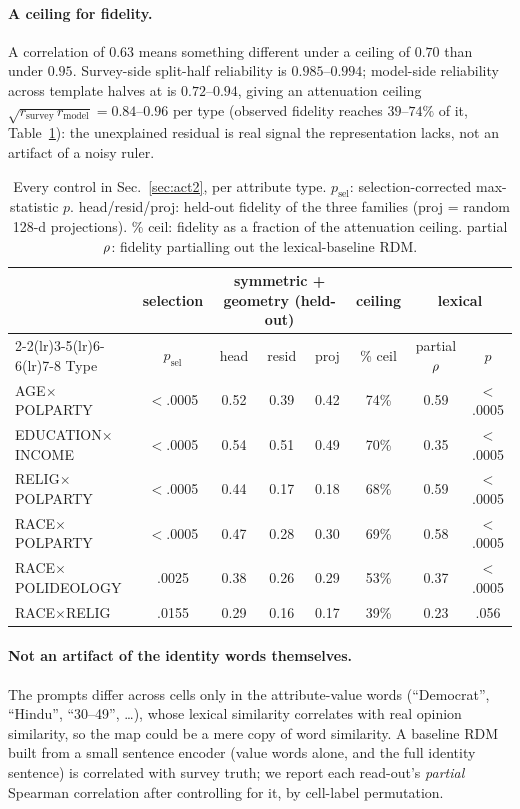 \paragraph{A ceiling for fidelity.} A correlation of $0.63$ means
something different under a ceiling of $0.70$ than under $0.95$.
Survey-side split-half reliability is $0.985$--$0.994$; model-side
reliability across template halves at \starhead{} is $0.72$--$0.94$,
giving an attenuation ceiling $\sqrt{r_{\text{survey}}\,r_{\text{model}}}
= 0.84$--$0.96$ per type (observed fidelity reaches $39$--$74\%$ of it,
Table~\ref{tab:controls}): the unexplained residual is real signal the
representation lacks, not an artifact of a noisy ruler.

\begin{table}[t]
\centering\footnotesize
\setlength{\tabcolsep}{4pt}
\caption{Every control in Sec.~\ref{sec:act2}, per attribute type.
$p_{\text{sel}}$: selection-corrected max-statistic $p$. head/resid/proj:
held-out fidelity of the three families (proj = random 128-d
projections). \% ceil: \starhead{} fidelity as a fraction of the
attenuation ceiling. partial $\rho$: \starhead{} fidelity partialling
out the lexical-baseline RDM.}
\label{tab:controls}
\begin{tabular}{lccccccc}
\toprule
& \multicolumn{1}{c}{selection} & \multicolumn{3}{c}{symmetric + geometry (held-out)}
& \multicolumn{1}{c}{ceiling} & \multicolumn{2}{c}{lexical}\\
\cmidrule(lr){2-2}\cmidrule(lr){3-5}\cmidrule(lr){6-6}\cmidrule(lr){7-8}
Type & $p_{\text{sel}}$ & head & resid & proj & \% ceil & partial $\rho$ & $p$\\
\midrule
AGE$\times$POLPARTY & $<$.0005 & 0.52 & 0.39 & 0.42 & 74\% & 0.59 & $<$.0005 \\
EDUCATION$\times$INCOME & $<$.0005 & 0.54 & 0.51 & 0.49 & 70\% & 0.35 & $<$.0005 \\
RELIG$\times$POLPARTY & $<$.0005 & 0.44 & 0.17 & 0.18 & 68\% & 0.59 & $<$.0005 \\
RACE$\times$POLPARTY & $<$.0005 & 0.47 & 0.28 & 0.30 & 69\% & 0.58 & $<$.0005 \\
RACE$\times$POLIDEOLOGY & .0025 & 0.38 & 0.26 & 0.29 & 53\% & 0.37 & $<$.0005 \\
RACE$\times$RELIG & .0155 & 0.29 & 0.16 & 0.17 & 39\% & 0.23 & .056 \\
\bottomrule
\end{tabular}
\end{table}

\paragraph{Not an artifact of the identity words themselves.}
\label{sec:lexical}
The prompts differ across cells only in the attribute-value words
(``Democrat'', ``Hindu'', ``30--49'', \dots), whose lexical similarity
correlates with real opinion similarity, so the map could be a mere copy
of word similarity. A baseline RDM built from a small sentence encoder
\citep{minilm2020} (value words alone, and the full identity sentence)
is correlated with survey truth; we report each read-out's
\emph{partial} Spearman correlation after controlling for it, by
cell-label permutation.

